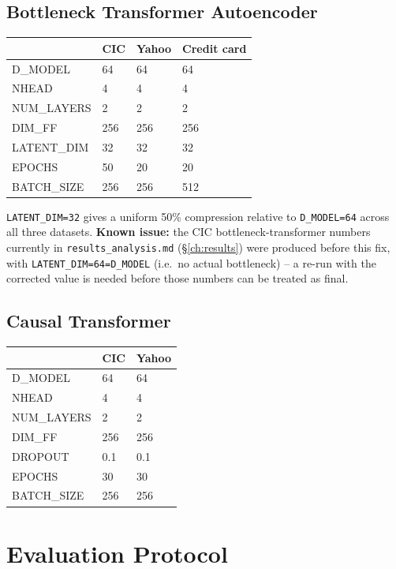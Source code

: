 \subsection{Bottleneck Transformer Autoencoder}

\begin{center}
\begin{tabular}{llll}
\toprule
 & CIC & Yahoo & Credit card \\
\midrule
D\_MODEL & 64 & 64 & 64 \\
NHEAD & 4 & 4 & 4 \\
NUM\_LAYERS & 2 & 2 & 2 \\
DIM\_FF & 256 & 256 & 256 \\
LATENT\_DIM & 32 & 32 & 32 \\
EPOCHS & 50 & 20 & 20 \\
BATCH\_SIZE & 256 & 256 & 512 \\
\bottomrule
\end{tabular}
\end{center}

\texttt{LATENT\_DIM=32} gives a uniform 50\% compression relative to \texttt{D\_MODEL=64} across all three datasets. \textbf{Known issue:} the CIC bottleneck-transformer numbers currently in \texttt{results\_analysis.md} (\S\ref{ch:results}) were produced before this fix, with \texttt{LATENT\_DIM=64=D\_MODEL} (i.e.\ no actual bottleneck) -- a re-run with the corrected value is needed before those numbers can be treated as final.

\subsection{Causal Transformer}

\begin{center}
\begin{tabular}{lll}
\toprule
 & CIC & Yahoo \\
\midrule
D\_MODEL & 64 & 64 \\
NHEAD & 4 & 4 \\
NUM\_LAYERS & 2 & 2 \\
DIM\_FF & 256 & 256 \\
DROPOUT & 0.1 & 0.1 \\
EPOCHS & 30 & 30 \\
BATCH\_SIZE & 256 & 256 \\
\bottomrule
\end{tabular}
\end{center}

\section{Evaluation Protocol}
\label{sec:eval-protocol}

